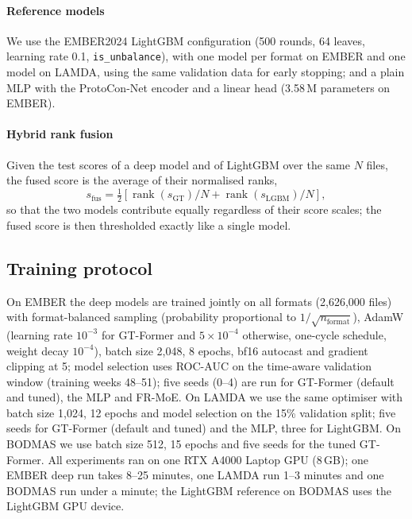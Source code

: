 \documentclass[fleqn,10pt]{wlscirep}
\newcommand{\gtf}{GT\mbox{-}Former}
\newcommand{\lgbm}{LightGBM}
\DeclareMathOperator{\rank}{rank}
\begin{document}
\paragraph{Reference models}
We use the EMBER2024 \lgbm{} configuration (500 rounds, 64 leaves, learning rate 0.1, \texttt{is\_unbalance}), with one model per format on EMBER and one model on LAMDA, using the same validation data for early stopping; and a plain MLP with the ProtoCon-Net encoder and a linear head (3.58\,M parameters on EMBER).

\paragraph{Hybrid rank fusion}
Given the test scores of a deep model and of \lgbm{} over the same $N$ files, the fused score is the average of their normalised ranks,
\begin{equation}
s_{\mathrm{fus}} = \tfrac{1}{2}\left[ \rank(s_{\mathrm{GT}})/N + \rank(s_{\mathrm{LGBM}})/N \right],
\label{eq:fusion}
\end{equation}
so that the two models contribute equally regardless of their score scales; the fused score is then thresholded exactly like a single model.

\subsection{Training protocol}
\label{sec:training}
On EMBER the deep models are trained jointly on all formats (2,626,000 files) with format-balanced sampling (probability proportional to $1/\sqrt{n_{\mathrm{format}}}$), AdamW (learning rate $10^{-3}$ for \gtf{} and $5 \times 10^{-4}$ otherwise, one-cycle schedule, weight decay $10^{-4}$), batch size 2,048, 8 epochs, bf16 autocast and gradient clipping at 5; model selection uses ROC-AUC on the time-aware validation window (training weeks 48--51); five seeds (0--4) are run for \gtf{} (default and tuned), the MLP and FR-MoE. On LAMDA we use the same optimiser with batch size 1,024, 12 epochs and model selection on the 15\% validation split; five seeds for \gtf{} (default and tuned) and the MLP, three for \lgbm{}. On BODMAS we use batch size 512, 15 epochs and five seeds for the tuned \gtf{}. All experiments ran on one RTX A4000 Laptop GPU (8\,GB); one EMBER deep run takes 8--25 minutes, one LAMDA run 1--3 minutes and one BODMAS run under a minute; the \lgbm{} reference on BODMAS uses the \lgbm{} GPU device.
\end{document}
